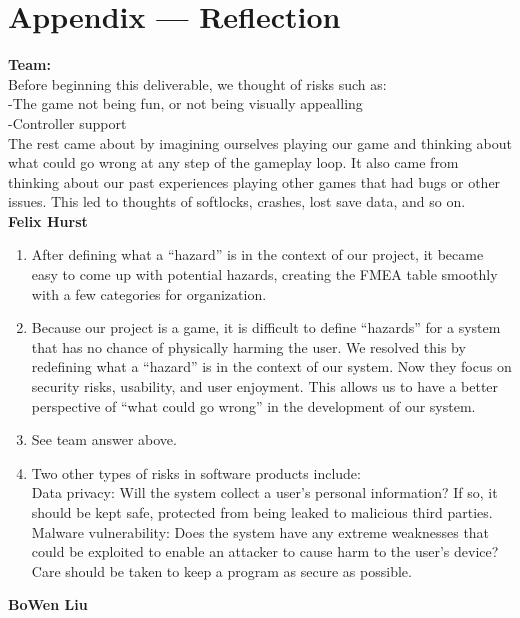 \documentclass{article}
\begin{document}
\section*{Appendix --- Reflection}
\textbf{Team:}\\
Before beginning this deliverable, we thought of risks such as:\\
-The game not being fun, or not being visually appealling\\
-Controller support\\
The rest came about by imagining ourselves playing our game and thinking about what could go wrong at any step of the gameplay loop. It also came from thinking about our past experiences playing other games that had bugs or other issues. This led to thoughts of softlocks, crashes, lost save data, and so on.\\
\textbf{Felix Hurst}
\begin{enumerate}
\item{After defining what a “hazard” is in the context of our project, it became easy to come up with potential hazards, creating the FMEA table smoothly with a few categories for organization.}
\item{Because our project is a game, it is difficult to define “hazards” for a system that has no chance of physically harming the user. We resolved this by redefining what a “hazard” is in the context of our system. Now they focus on security risks, usability, and user enjoyment. This allows us to have a better perspective of “what could go wrong” in the development of our system.}
\item{See team answer above.}
\item{Two other types of risks in software products include:\\
Data privacy: Will the system collect a user’s personal information? If so, it should be kept safe, protected from being leaked to malicious third parties.\\
Malware vulnerability: Does the system have any extreme weaknesses that could be exploited to enable an attacker to cause harm to the user’s device? Care should be taken to keep a program as secure as possible.}
\end{enumerate}
\textbf{BoWen Liu}
\end{document}
